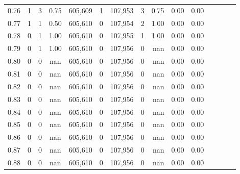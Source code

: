 \begin{tabular}{rrrcrrrrrrrrrrr}
0.76 &       1 &      3 &                                       0.75 &  605,609 &        1 &  107,953 &        3 &  0.75 &  0.00 &                         0.00 \\
0.77 &       1 &      1 &                                       0.50 &  605,610 &        0 &  107,954 &        2 &  1.00 &  0.00 &                         0.00 \\
0.78 &       0 &      1 &                                       1.00 &  605,610 &        0 &  107,955 &        1 &  1.00 &  0.00 &                         0.00 \\
0.79 &       0 &      1 &                                       1.00 &  605,610 &        0 &  107,956 &        0 &   nan &  0.00 &                         0.00 \\
0.80 &       0 &      0 &                                        nan &  605,610 &        0 &  107,956 &        0 &   nan &  0.00 &                         0.00 \\
0.81 &       0 &      0 &                                        nan &  605,610 &        0 &  107,956 &        0 &   nan &  0.00 &                         0.00 \\
0.82 &       0 &      0 &                                        nan &  605,610 &        0 &  107,956 &        0 &   nan &  0.00 &                         0.00 \\
0.83 &       0 &      0 &                                        nan &  605,610 &        0 &  107,956 &        0 &   nan &  0.00 &                         0.00 \\
0.84 &       0 &      0 &                                        nan &  605,610 &        0 &  107,956 &        0 &   nan &  0.00 &                         0.00 \\
0.85 &       0 &      0 &                                        nan &  605,610 &        0 &  107,956 &        0 &   nan &  0.00 &                         0.00 \\
0.86 &       0 &      0 &                                        nan &  605,610 &        0 &  107,956 &        0 &   nan &  0.00 &                         0.00 \\
0.87 &       0 &      0 &                                        nan &  605,610 &        0 &  107,956 &        0 &   nan &  0.00 &                         0.00 \\
0.88 &       0 &      0 &                                        nan &  605,610 &        0 &  107,956 &        0 &   nan &  0.00 &                         0.00 \\

\end{tabular}
